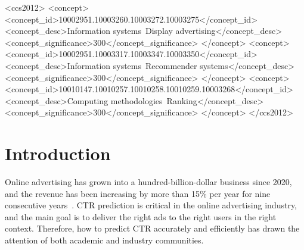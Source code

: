 \documentclass[sigconf]{acmart}
\begin{document}
\begin{CCSXML}
<ccs2012>
<concept>
<concept_id>10002951.10003260.10003272.10003275</concept_id>
<concept_desc>Information systems~Display advertising</concept_desc>
<concept_significance>300</concept_significance>
</concept>
<concept>
<concept_id>10002951.10003317.10003347.10003350</concept_id>
<concept_desc>Information systems~Recommender systems</concept_desc>
<concept_significance>300</concept_significance>
</concept>
<concept>
<concept_id>10010147.10010257.10010258.10010259.10003268</concept_id>
<concept_desc>Computing methodologies~Ranking</concept_desc>
<concept_significance>300</concept_significance>
</concept>
</ccs2012>
\end{CCSXML}



\maketitle

\section{Introduction}



Online advertising has grown into a hundred-billion-dollar business since 2020, and the revenue has been increasing by more than 15\% per year for nine consecutive years~\cite{financial_report}. CTR prediction is critical in the online advertising industry, and the main goal is to deliver the right ads to the right users in the right context. Therefore, how to predict CTR accurately and efficiently has drawn the attention of both academic and industry communities.
\end{document}
